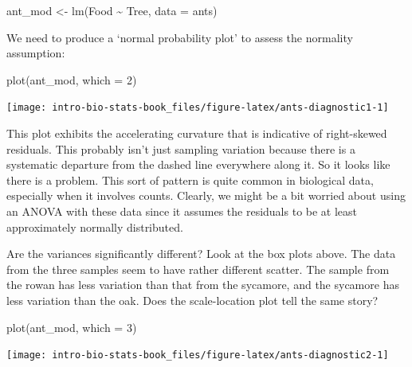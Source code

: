 \documentclass[
]{book}
\newenvironment{Shaded}{\begin{snugshade}}{\end{snugshade}}
\newcommand{\AttributeTok}[1]{\textcolor[rgb]{0.77,0.63,0.00}{#1}}
\newcommand{\DecValTok}[1]{\textcolor[rgb]{0.00,0.00,0.81}{#1}}
\newcommand{\FunctionTok}[1]{\textcolor[rgb]{0.00,0.00,0.00}{#1}}
\newcommand{\NormalTok}[1]{#1}
\newcommand{\OtherTok}[1]{\textcolor[rgb]{0.56,0.35,0.01}{#1}}
\newcommand{\SpecialCharTok}[1]{\textcolor[rgb]{0.00,0.00,0.00}{#1}}
\begin{document}
\begin{Shaded}
\begin{Highlighting}[]
\NormalTok{ant\_mod }\OtherTok{\textless{}{-}} \FunctionTok{lm}\NormalTok{(Food }\SpecialCharTok{\textasciitilde{}}\NormalTok{ Tree, }\AttributeTok{data =}\NormalTok{ ants)}
\end{Highlighting}
\end{Shaded}

We need to produce a `normal probability plot' to assess the normality assumption:

\begin{Shaded}
\begin{Highlighting}[]
\FunctionTok{plot}\NormalTok{(ant\_mod, }\AttributeTok{which =} \DecValTok{2}\NormalTok{)}
\end{Highlighting}
\end{Shaded}

\begin{center}\texttt{[image: intro-bio-stats-book\_files/figure-latex/ants-diagnostic1-1]} \end{center}

This plot exhibits the accelerating curvature that is indicative of right-skewed residuals. This probably isn't just sampling variation because there is a systematic departure from the dashed line everywhere along it. So it looks like there is a problem. This sort of pattern is quite common in biological data, especially when it involves counts. Clearly, we might be a bit worried about using an ANOVA with these data since it assumes the residuals to be at least approximately normally distributed.

Are the variances significantly different? Look at the box plots above. The data from the three samples seem to have rather different scatter. The sample from the rowan has less variation than that from the sycamore, and the sycamore has less variation than the oak. Does the scale-location plot tell the same story?

\begin{Shaded}
\begin{Highlighting}[]
\FunctionTok{plot}\NormalTok{(ant\_mod, }\AttributeTok{which =} \DecValTok{3}\NormalTok{)}
\end{Highlighting}
\end{Shaded}

\begin{center}\texttt{[image: intro-bio-stats-book\_files/figure-latex/ants-diagnostic2-1]} \end{center}
\end{document}
